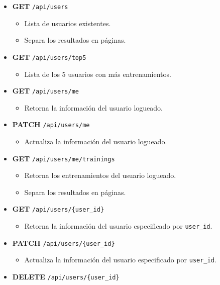 \documentclass[12pt,a4paper,]{scrartcl}
\providecommand{\tightlist}{%
  \setlength{\itemsep}{0pt}\setlength{\parskip}{0pt}}
\begin{document}
\begin{itemize}
\tightlist
\item
  \textbf{GET} \texttt{/api/users}

  \begin{itemize}
  \tightlist
  \item
    Lista de usuarios existentes.
  \item
    Separa los resultados en páginas.
  \end{itemize}
\item
  \textbf{GET} \texttt{/api/users/top5}

  \begin{itemize}
  \tightlist
  \item
    Lista de los 5 usuarios con más entrenamientos.
  \end{itemize}
\item
  \textbf{GET} \texttt{/api/users/me}

  \begin{itemize}
  \tightlist
  \item
    Retorna la información del usuario logueado.
  \end{itemize}
\item
  \textbf{PATCH} \texttt{/api/users/me}

  \begin{itemize}
  \tightlist
  \item
    Actualiza la información del usuario logueado.
  \end{itemize}
\item
  \textbf{GET} \texttt{/api/users/me/trainings}

  \begin{itemize}
  \tightlist
  \item
    Retorna los entrenamientos del usuario logueado.
  \item
    Separa los resultados en páginas.
  \end{itemize}
\item
  \textbf{GET} \texttt{/api/users/\{user\_id\}}

  \begin{itemize}
  \tightlist
  \item
    Retorna la información del usuario especificado por \texttt{user\_id}.
  \end{itemize}
\item
  \textbf{PATCH} \texttt{/api/users/\{user\_id\}}

  \begin{itemize}
  \tightlist
  \item
    Actualiza la información del usuario especificado por \texttt{user\_id}.
  \end{itemize}
\item
  \textbf{DELETE} \texttt{/api/users/\{user\_id\}}


\end{itemize}
\end{document}
